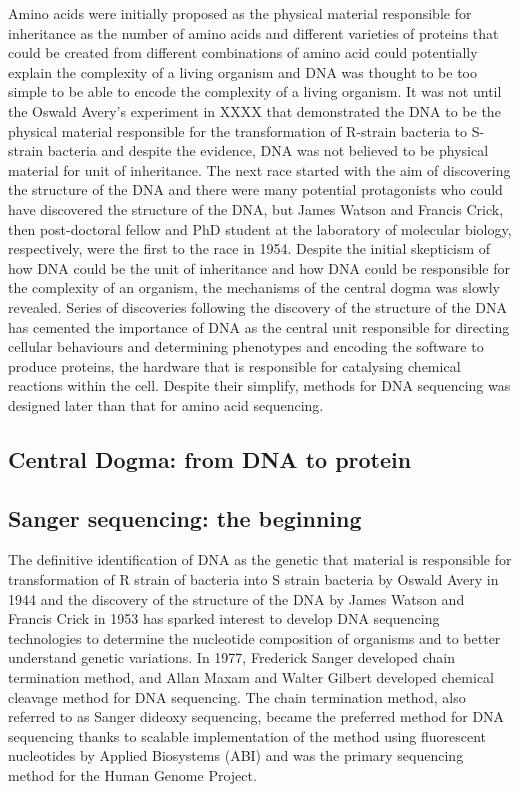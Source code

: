 Amino acids were initially proposed as the physical material responsible for inheritance as the number of amino acids and different varieties of proteins that could be created from different combinations of amino acid could potentially explain the complexity of a living organism and DNA was thought to be too simple to be able to encode the complexity of a living organism. It was not until the Oswald Avery's experiment in XXXX that demonstrated the DNA to be the physical material responsible for the transformation of R-strain bacteria to S-strain bacteria and despite the evidence, DNA was not believed to be physical material for unit of inheritance. The next race started with the aim of discovering the structure of the DNA and there were many potential protagonists who could have discovered the structure of the DNA, but James Watson and Francis Crick, then post-doctoral fellow and PhD student at the laboratory of molecular biology, respectively, were the first to the race in 1954\cite{}. Despite the initial skepticism of how DNA could be the unit of inheritance and how DNA could be responsible for the complexity of an organism, the mechanisms of the central dogma was slowly revealed. Series of discoveries following the discovery of the structure of the DNA has cemented the importance of DNA as the central unit responsible for directing cellular behaviours and determining phenotypes and encoding the software to produce proteins, the hardware that is responsible for catalysing chemical reactions within the cell. Despite their simplify, methods for DNA sequencing was designed later than that for amino acid sequencing. 

\subsection{Central Dogma: from DNA to protein}

\subsection{Sanger sequencing: the beginning}

The definitive identification of DNA as the genetic that material is responsible for transformation of R strain of bacteria into S strain bacteria by Oswald Avery in 1944\cite{} and the discovery of the structure of the DNA by James Watson and Francis Crick in 1953\cite{} has sparked interest to develop DNA sequencing technologies to determine the nucleotide composition of organisms and to better understand genetic variations. In 1977, Frederick Sanger developed chain termination method\cite{}, and Allan Maxam and Walter Gilbert developed chemical cleavage method\cite{} for DNA sequencing. The chain termination method, also referred to as Sanger dideoxy sequencing, became the preferred method for DNA sequencing thanks to scalable implementation of the method using fluorescent nucleotides by Applied Biosystems (ABI) \cite{} and was the primary sequencing method for the Human Genome Project.

